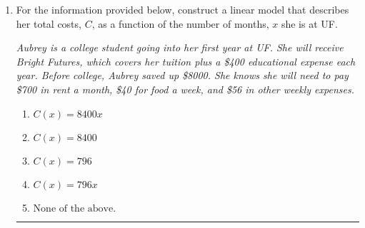\documentclass[14pt]{extbook}
\newcommand{\litem}[1]{\item#1\hspace*{-1cm}\rule{\textwidth}{0.4pt}}
\begin{document}
\begin{enumerate}
{\begin{enumerate}[label=\Alph*.]
\end{enumerate} }
\litem{
For the information provided below, construct a linear model that describes her total costs, $C$, as a function of the number of months, $x$ she is at UF. 
\begin{center}
    \textit{ Aubrey is a college student going into her first year at UF. She will receive Bright Futures, which covers her tuition plus a \$400 educational expense each year. Before college, Aubrey saved up \$8000. She knows she will need to pay \$700 in rent a month, \$40 for food a week, and \$56 in other weekly expenses. }
\end{center}
\begin{enumerate}[label=\Alph*.]
\item \( C(x) = 8400 x \)
\item \( C(x) = 8400 \)
\item \( C(x) = 796 \)
\item \( C(x) = 796 x \)
\item \( \text{None of the above.} \)

\end{enumerate} }
\end{enumerate}
\end{document}
